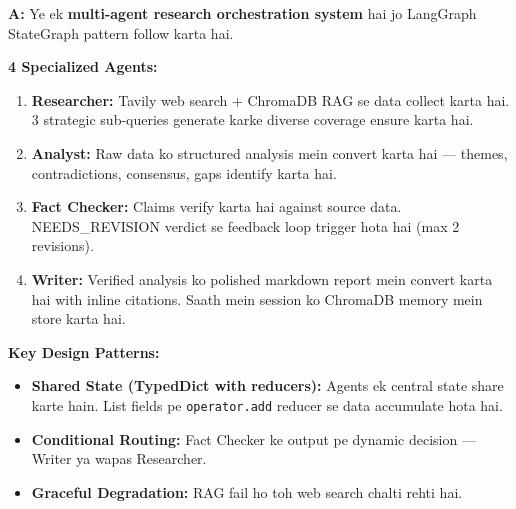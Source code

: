 \documentclass[12pt, a4paper]{article}
\begin{document}
\begin{interviewbox}[title={\faIcon{user-tie} ~Q1: Is project ka high-level architecture explain karo.}]
\textbf{A:} Ye ek \textbf{multi-agent research orchestration system} hai jo LangGraph StateGraph pattern follow karta hai.

\textbf{4 Specialized Agents:}
\begin{enumerate}
\item \textbf{Researcher:} Tavily web search + ChromaDB RAG se data collect karta hai. 3 strategic sub-queries generate karke diverse coverage ensure karta hai.
\item \textbf{Analyst:} Raw data ko structured analysis mein convert karta hai --- themes, contradictions, consensus, gaps identify karta hai.
\item \textbf{Fact Checker:} Claims verify karta hai against source data. NEEDS\_REVISION verdict se feedback loop trigger hota hai (max 2 revisions).
\item \textbf{Writer:} Verified analysis ko polished markdown report mein convert karta hai with inline citations. Saath mein session ko ChromaDB memory mein store karta hai.
\end{enumerate}

\textbf{Key Design Patterns:}
\begin{itemize}
\item \textbf{Shared State (TypedDict with reducers):} Agents ek central state share karte hain. List fields pe \texttt{operator.add} reducer se data accumulate hota hai.
\item \textbf{Conditional Routing:} Fact Checker ke output pe dynamic decision --- Writer ya wapas Researcher.
\item \textbf{Graceful Degradation:} RAG fail ho toh web search chalti rehti hai.
\end{itemize}
\end{interviewbox}
\end{document}
